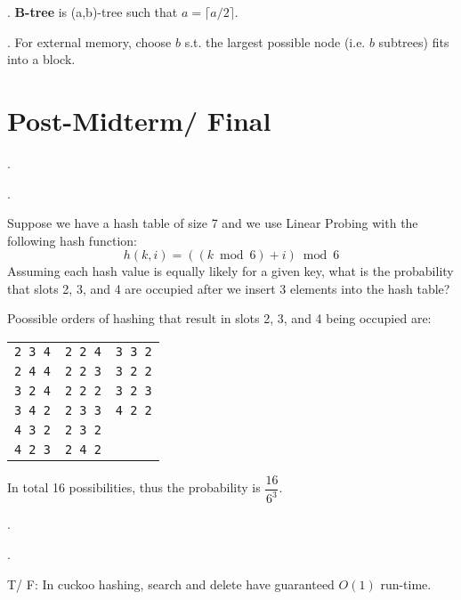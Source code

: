 \documentclass{article}
\begin{document}
\begin{deff}.
    \textbf{B-tree} is (a,b)-tree such that $a = \lceil a / 2 \rceil$. 
\end{deff}

\begin{comm}[].
    For external memory, choose $b$ s.t. the largest possible node (i.e. $b$ subtrees) fits into a block. 
\end{comm}

\newpage

\section{Post-Midterm/ Final} 

\begin{exer}[]. 
    \begin{cate}. \end{cate}
    Suppose we have a hash table of size 7 and we use Linear Probing with the following hash function: 
    \[ h(k, i) = ((k \bmod 6) + i) \bmod 6 \]
    Assuming each hash value is equally likely for a given key, what is the probability that slots 2, 3, and 4 are occupied after we insert 3 elements into the hash table?
\end{exer}

\begin{solution}
    Poossible orders of hashing that result in slots 2, 3, and 4 being occupied are: \begin{center}
        \begin{tabular}{|c c c|} \hline
            \texttt{2 3 4} & \texttt{2 2 4} & \texttt{3 3 2} \\ 
            \texttt{2 4 4} & \texttt{2 2 3} & \texttt{3 2 2} \\ 
            \texttt{3 2 4} & \texttt{2 2 2} & \texttt{3 2 3} \\ 
            \texttt{3 4 2} & \texttt{2 3 3} & \texttt{4 2 2} \\ 
            \texttt{4 3 2} & \texttt{2 3 2} & \\ 
            \texttt{4 2 3} & \texttt{2 4 2} & \\ \hline
        \end{tabular}
    \end{center} 
    In total 16 possibilities, thus the probability is $\dfrac{16}{6^3}$. 
\end{solution}

\begin{exer}[].
    \begin{cate}. \end{cate}
    T/ F: In cuckoo hashing, search and delete have guaranteed $O(1)$ run-time.
\end{exer}
\end{document}
